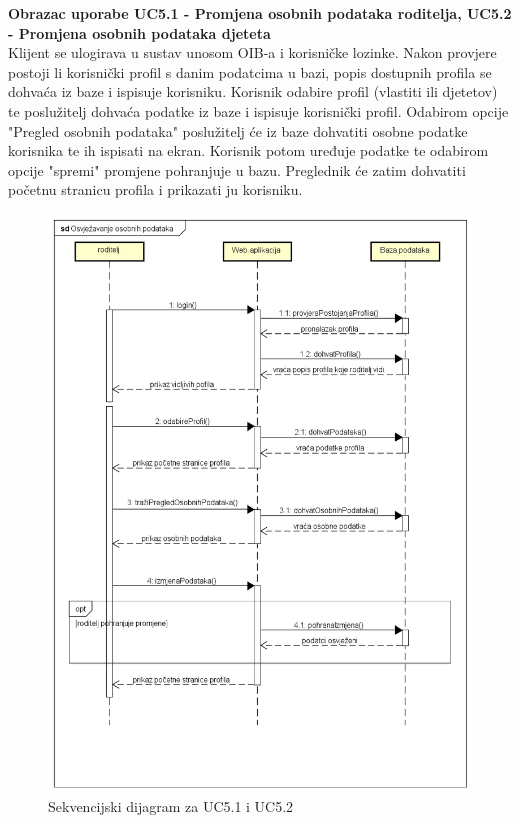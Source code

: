 				\eject
				
				
				\textbf{Obrazac uporabe UC5.1 - Promjena osobnih podataka roditelja, UC5.2 - Promjena osobnih podataka djeteta}\\
			
				
				Klijent se ulogirava u sustav unosom OIB-a i korisničke lozinke. Nakon provjere postoji li korisnički profil s danim podatcima u bazi, popis dostupnih profila se dohvaća iz baze i ispisuje korisniku. Korisnik odabire profil (vlastiti ili djetetov) te poslužitelj dohvaća podatke iz baze i ispisuje korisnički profil. Odabirom opcije "Pregled osobnih podataka" poslužitelj će iz baze dohvatiti osobne podatke korisnika te ih ispisati na ekran. Korisnik potom uređuje podatke te odabirom opcije "spremi" promjene pohranjuje u bazu. Preglednik će zatim dohvatiti početnu stranicu profila i prikazati ju korisniku.
				\eject
				
				\begin{figure}[H]
					\includegraphics[scale=0.6]{dijagrami/OsobniPodatci.PNG} %
					\centering
					\caption{Sekvencijski dijagram za UC5.1 i UC5.2}
					\label{fig:sekvencijski1}
				\end{figure}
				
